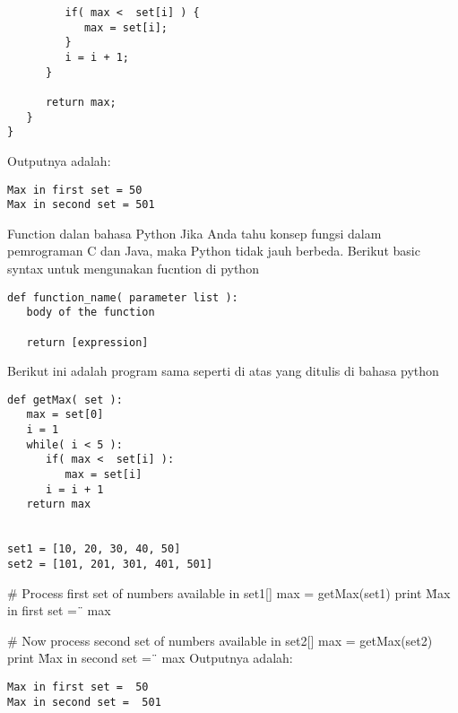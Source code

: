 \begin {verbatim}
         if( max <  set[i] ) {
            max = set[i];
         }
         i = i + 1;
      }
     
      return max;
   }
}
\end {verbatim}
Outputnya adalah: 
\begin {verbatim}
Max in first set = 50
Max in second set = 501
\end {verbatim}

Function dalan bahasa Python
Jika Anda tahu konsep fungsi dalam pemrograman C dan Java, maka Python tidak jauh berbeda. Berikut basic syntax untuk mengunakan fucntion di python 

\begin {verbatim}
def function_name( parameter list ):
   body of the function
   
   return [expression]
\end {verbatim}
Berikut ini adalah program sama seperti di atas yang ditulis di bahasa python 
\begin {verbatim}
def getMax( set ):
   max = set[0]
   i = 1  
   while( i < 5 ):
      if( max <  set[i] ):
         max = set[i]
      i = i + 1
   return max
 
 
set1 = [10, 20, 30, 40, 50]
set2 = [101, 201, 301, 401, 501]
\end {verbatim}
 
# Process first set of numbers available in set1[]
max = getMax(set1)
print \"Max in first set = \"\, max
     
# Now process second set of numbers available in set2[]
max = getMax(set2)
print \"Max in second set = \"\, max
Outputnya adalah: 
\begin {verbatim}
Max in first set =  50
Max in second set =  501
\end {verbatim}
